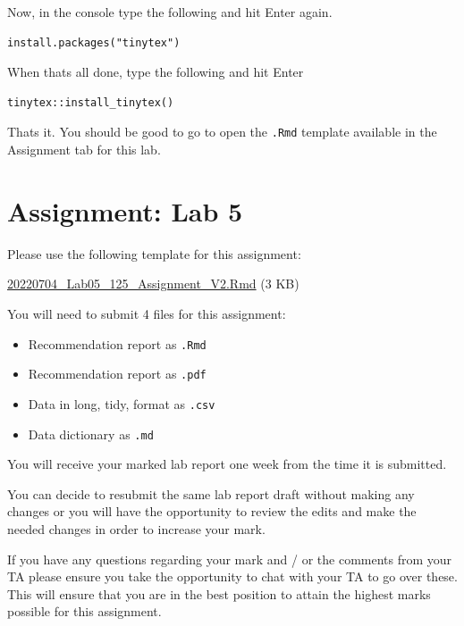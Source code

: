 \documentclass[
]{book}
\providecommand{\tightlist}{%
  \setlength{\itemsep}{0pt}\setlength{\parskip}{0pt}}
\begin{document}
Now, in the console type the following and hit \textquotesingle Enter\textquotesingle{} again.

\begin{verbatim}
install.packages("tinytex")
\end{verbatim}

When that\textquotesingle s all done, type the following and hit \textquotesingle Enter\textquotesingle{}

\begin{verbatim}
tinytex::install_tinytex()
\end{verbatim}

That\textquotesingle s it. You should be good to go to open the \texttt{.Rmd} template available in the Assignment tab for this lab.

\hypertarget{assignment-lab-5}{%
\chapter*{Assignment: Lab 5}\label{assignment-lab-5}}

Please use the following template for this assignment:

\href{https://osf.io/download/76ma4}{20220704\_Lab05\_125\_Assignment\_V2.Rmd} (3 KB)

You will need to submit 4 files for this assignment:

\begin{itemize}
\tightlist
\item
  Recommendation report as \texttt{.Rmd}
\item
  Recommendation report as \texttt{.pdf}
\item
  Data in long, tidy, format as \texttt{.csv}
\item
  Data dictionary as \texttt{.md}
\end{itemize}

You will receive your marked lab report one week from the time it is submitted.

You can decide to resubmit the same lab report draft without making any changes or you will have the opportunity to review the edits and make the needed changes in order to increase your mark.

If you have any questions regarding your mark and / or the comments from your TA please ensure you take the opportunity to chat with your TA to go over these. This will ensure that you are in the best position to attain the highest marks possible for this assignment.
\end{document}
